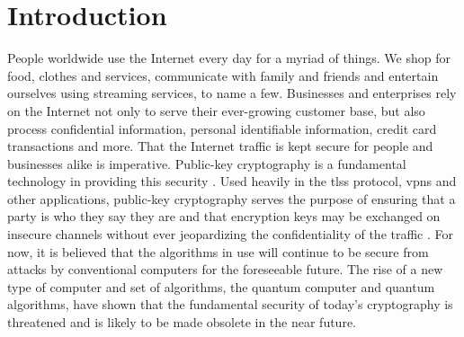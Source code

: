 \chapter{Introduction}
\label{chapter:introduction}




People worldwide use the Internet every day for a myriad of things. We shop for food, clothes and services, communicate with family and friends and entertain ourselves using streaming services, to name a few. Businesses and enterprises rely on the Internet not only to serve their ever-growing customer base, but also process confidential information, personal identifiable information, credit card transactions and more. That the Internet traffic is kept secure for people and businesses alike is imperative. Public-key cryptography is a fundamental technology in providing this security \cite{rfc8446}. Used heavily in the \glspl{tls} protocol, \glspl{vpn} and other applications, public-key cryptography serves the purpose of ensuring that a party is who they say they are and that encryption keys may be exchanged on insecure channels without ever jeopardizing the confidentiality of the traffic \cite{rfc8446}. For now, it is believed that the algorithms in use will continue to be secure from attacks by conventional computers for the foreseeable future. The rise of a new type of computer and set of algorithms, the quantum computer and quantum algorithms, have shown that the fundamental security of today's cryptography is threatened and is likely to be made obsolete in the near future.

